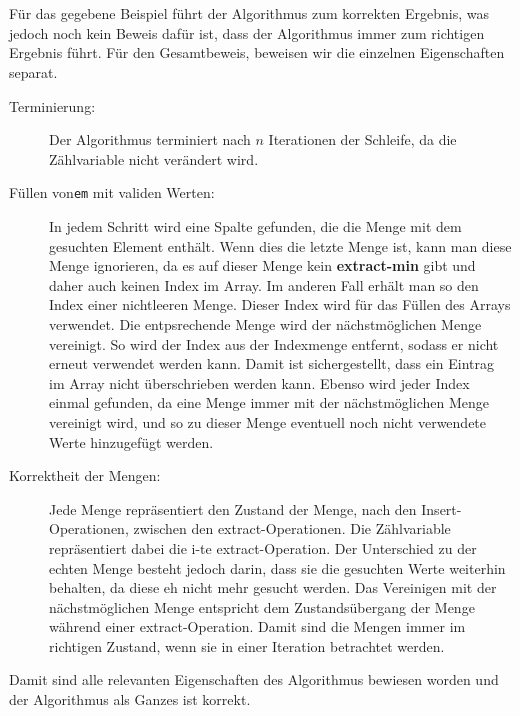 \documentclass[a4paper,10pt]{article}
\begin{document}
\begin{enumerate}
\begin{tabular}{ c || c | c | l | l | l | p{1.5cm} | p{1.2cm} | l | p{1.2cm} || l }
	\hline
	\end{tabular}\\ \\
Für das gegebene Beispiel führt der Algorithmus zum korrekten Ergebnis, was jedoch noch kein Beweis dafür ist, dass der Algorithmus immer zum richtigen Ergebnis führt.
Für den Gesamtbeweis, beweisen wir die einzelnen Eigenschaften separat.
\begin{description}
	\item[Terminierung:] Der Algorithmus terminiert nach $n$ Iterationen der Schleife, da die Zählvariable nicht verändert wird.
	\item[Füllen von\texttt{em} mit validen Werten:] In jedem Schritt wird eine Spalte gefunden, die die Menge mit dem gesuchten Element enthält. Wenn dies die letzte Menge ist, kann man diese Menge ignorieren, da es auf dieser Menge kein \textbf{extract-min} gibt und daher auch keinen Index im Array. Im anderen Fall erhält man so den Index einer nichtleeren Menge. Dieser Index wird für das Füllen des Arrays verwendet. Die entpsrechende Menge wird der nächstmöglichen Menge vereinigt. So wird der Index aus der Indexmenge entfernt, sodass er nicht erneut verwendet werden kann. Damit ist sichergestellt, dass ein Eintrag im Array nicht überschrieben werden kann. Ebenso wird jeder Index einmal gefunden, da eine Menge immer mit der nächstmöglichen Menge vereinigt wird, und so zu dieser Menge eventuell noch nicht verwendete Werte hinzugefügt werden.
	\item[Korrektheit der Mengen:] Jede Menge repräsentiert den Zustand der Menge, nach den Insert-Operationen, zwischen den extract-Operationen. Die Zählvariable repräsentiert dabei die i-te extract-Operation. Der Unterschied zu der echten Menge besteht jedoch darin, dass sie die gesuchten Werte weiterhin behalten, da diese eh nicht mehr gesucht werden. Das Vereinigen mit der nächstmöglichen Menge entspricht dem Zustandsübergang der Menge während einer extract-Operation. Damit sind die Mengen immer im richtigen Zustand, wenn sie in einer Iteration betrachtet werden.
\end{description}
Damit sind alle relevanten Eigenschaften des Algorithmus bewiesen worden und der Algorithmus als Ganzes ist korrekt.


\end{enumerate}
\end{document}
